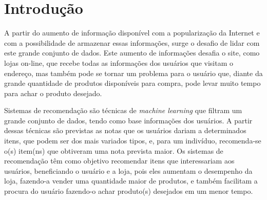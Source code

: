 \documentclass[12pt,a4paper,header]{abnt}
\begin{document}
% 
% 
% 
% 
% 
% 
% 
% 
% 
% 


\tableofcontents{}
\listoffigures
\listoftables



\chapter{Introdução} \label{cap:introducao}

A partir do aumento de informação disponível com a popularização da Internet e com a possibilidade de armazenar essas informações, surge o desafio de lidar com este grande conjunto de dados\cite{isinkaye2015recommendation}. Este aumento de informações desafia o site, como lojas on-line, que recebe todas as informações dos usuários que visitam o endereço, mas também pode se tornar um problema para o usuário que, diante da grande quantidade de produtos disponíveis para compra, pode levar muito tempo para achar o produto desejado\cite{mild2002collaborative}.

Sistemas de recomendação são técnicas de \textit{machine learning} que filtram um grande conjunto de dados, tendo como base informações dos usuários\cite{takahashi2015estudo}. A partir dessas técnicas são previstas as notas que os usuários dariam a determinados itens, que podem ser dos mais variados tipos, e, para um indivíduo, recomenda-se o(s) item(ns) que obtiveram uma nota prevista maior\cite{shapira2011recommender}. Os sistemas de recomendação têm como objetivo recomendar itens que interessariam aos usuários\cite{melville2011recommender}, beneficiando o usuário e a loja, pois eles aumentam o desempenho da loja, fazendo-a vender uma quantidade maior de produtos, e também facilitam a procura do usuário fazendo-o achar produto(s) desejados em um menor tempo\cite{isinkaye2015recommendation}. 
\end{document}
